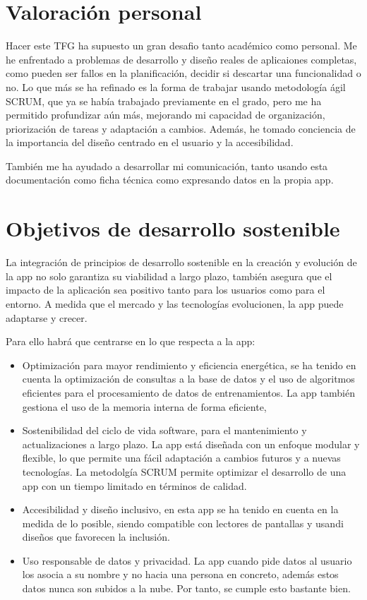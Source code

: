 \section{Valoración personal}

Hacer este TFG ha supuesto un gran desafio tanto académico como personal. Me he enfrentado a problemas de desarrollo y diseño reales de aplicaiones completas, como pueden ser fallos en la planificación, decidir si descartar una funcionalidad o no. Lo que más se ha refinado es la forma de trabajar usando metodología ágil SCRUM, que ya se había trabajado previamente en el grado, pero me ha permitido profundizar aún más, mejorando mi capacidad de organización, priorización de tareas y adaptación a cambios. Además, he tomado conciencia de la importancia del diseño centrado en el usuario y la accesibilidad.

También me ha ayudado a desarrollar mi comunicación, tanto usando esta documentación como ficha técnica como expresando datos en la propia app.

\section{Objetivos de desarrollo sostenible}

La integración de principios de desarrollo sostenible en la creación y evolución de la app no solo garantiza su viabilidad a largo plazo, también asegura que el impacto de la aplicación sea positivo tanto para los usuarios como para el entorno. A medida que el mercado y las tecnologías evolucionen, la app puede adaptarse y crecer.

Para ello habrá que centrarse en lo que respecta a la app:
\begin{itemize}
	\item Optimización para mayor rendimiento y eficiencia energética, se ha tenido en cuenta la optimización de consultas a la base de datos y el uso de algoritmos eficientes para el procesamiento de datos de entrenamientos. La app también gestiona el uso de la memoria interna de forma eficiente,
	\item Sostenibilidad del ciclo de vida software, para el mantenimiento y actualizaciones a largo plazo. La app está diseñada con un enfoque modular y flexible, lo que permite una fácil adaptación a cambios futuros y a nuevas tecnologías. La metodolgía SCRUM permite optimizar el desarrollo de una app con un tiempo limitado en términos de calidad.
	\item Accesibilidad y diseño inclusivo, en esta app se ha tenido en cuenta en la medida de lo posible, siendo compatible con lectores de pantallas y usandi diseños que favorecen la inclusión.
	\item Uso responsable de datos y privacidad. La app cuando pide datos al usuario los asocia a su nombre y no hacia una persona en concreto, además estos datos nunca son subidos a la nube. Por tanto, se cumple esto bastante bien.
\end{itemize}

